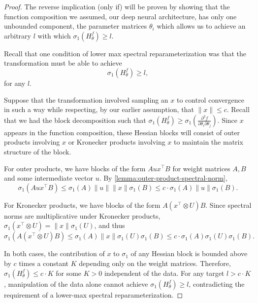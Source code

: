 \documentclass{article}
\theoremstyle{plain}
\theoremstyle{definition}
\theoremstyle{remark}
\begin{document}
\begin{proof}
The reverse implication (only if) will be proven by showing that the function composition we assumed, our deep neural architecture, has only one unbounded component, the parameter matrices $\theta_i$ which allows us to achieve an arbitrary $l$ with which $\sigma_1(H_{\theta}^f) \geq l$. 

Recall that one condition of lower max spectral reparameterization was that the transformation must be able to achieve \[
\sigma_{1}(H_{\theta}^f) \geq l,
\] for any $l$.

Suppose that the transformation involved sampling an $x$ to control convergence in such a way while  respecting, by our earlier assumption, that $\|x\| \leq c$. Recall that we had the block decomposition such that $\sigma_1(H_{\theta}^f) \geq \sigma_1(\frac{\partial^2 f}{\partial \theta_i \partial \theta_j})$. Since $x$ appears in the function composition, these Hessian blocks will consist of outer products involving $x$ or Kronecker products involving $x$ to maintain the matrix structure of the block.

For outer products, we have blocks of the form $Aux^\top B$ for weight matrices $A, B$ and some intermediate vector $u$. By \cref{lemma:outer-product-spectral-norm}, 
\[
\sigma_1(Aux^\top B) \leq \sigma_1(A)\|u\|\|x\|\sigma_1(B) \leq c \cdot \sigma_1(A)\|u\|\sigma_1(B).
\]

For Kronecker products, we have blocks of the form $A(x^\top \otimes U)B$. Since spectral norms are multiplicative under Kronecker products, $\sigma_1(x^\top \otimes U) = \|x\|\sigma_1(U)$, and thus
\[
\sigma_1(A(x^\top \otimes U)B) \leq \sigma_1(A)\|x\|\sigma_1(U)\sigma_1(B) \leq c \cdot \sigma_1(A)\sigma_1(U)\sigma_1(B).
\]

In both cases, the contribution of $x$ to $\sigma_1$ of any Hessian block is bounded above by $c$ times a constant $K$ depending only on the weight matrices. Therefore, $\sigma_1(H_\theta^f) \leq c \cdot K$ for some $K > 0$ independent of the data. For any target $l > c \cdot K$, manipulation of the data alone cannot achieve $\sigma_1(H_{\theta}^f) \geq l$, contradicting the requirement of a lower-max spectral reparameterization.


\end{proof}
\end{document}
